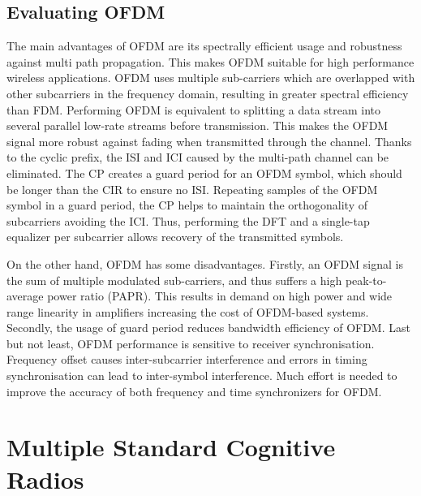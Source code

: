 \subsection{Evaluating OFDM}

The main advantages of OFDM are its spectrally efficient usage and robustness against multi path propagation.
This makes OFDM suitable for high performance wireless applications. 
OFDM uses multiple sub-carriers which are overlapped with other subcarriers in the frequency domain, resulting in greater spectral efficiency than FDM. 
Performing OFDM is equivalent to splitting a data stream into several parallel low-rate streams before transmission.
This makes the OFDM signal more robust against fading when transmitted through the channel. 
Thanks to the cyclic prefix, the ISI and ICI caused by the multi-path channel can be eliminated. 
The CP creates a guard period for an OFDM symbol, which should be longer than the CIR to ensure no ISI.
Repeating samples of the OFDM symbol in a guard period, the CP helps to maintain the orthogonality of subcarriers avoiding the ICI. 
Thus, performing the DFT and a single-tap equalizer per subcarrier allows recovery of the transmitted symbols.

On the other hand, OFDM has some disadvantages. 
Firstly, an OFDM signal is the sum of multiple modulated sub-carriers, and thus suffers a high peak-to-average power ratio (PAPR). 
This results in demand on high power and wide range linearity in amplifiers increasing the cost of OFDM-based systems.
Secondly, the usage of guard period reduces bandwidth efficiency of OFDM.
Last but not least, OFDM performance is sensitive to receiver synchronisation. Frequency offset causes inter-subcarrier interference and errors in timing synchronisation can lead to inter-symbol interference.
Much effort is needed to improve the accuracy of both frequency and time synchronizers for OFDM.

\section{Multiple Standard Cognitive Radios}

